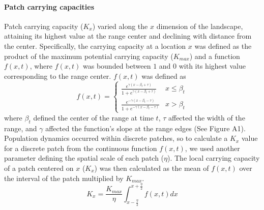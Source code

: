 \documentclass[11pt]{article}
\begin{document}
\paragraph{Patch carrying capacities}
Patch carrying capacity ($K_{x}$) varied along the $x$ dimension of the landscape, attaining its highest value at the range center and declining with distance from the center. Specifically, the carrying capacity at a location $x$ was defined as the product of the maximum potential carrying capacity ($K_{max}$) and a function $f(x,t)$, where $f(x,t)$ was bounded between $1$ and $0$ with its highest value corresponding to the range center. $f(x,t)$ was defined as
\begin{equation}
f(x,t)=
\begin{cases}
	\frac{e^{\gamma(x-\beta_{t}+\tau)}}{1+e^{\gamma(x-\beta_{t}+\tau)}} & x \leq \beta_{t} \\
	\frac{e^{-\gamma(x-\beta_{t}-\tau)}}{1+e^{-\gamma(x-\beta_{t}-\tau)}} & x > \beta_{t}
\end{cases}
\end{equation}
where $\beta_{t}$ defined the center of the range at time $t$, $\tau$ affected the width of the range, and $\gamma$ affected the function's slope at the range edges (See Figure A1). Population dynamics occurred within discrete patches, so to calculate a $K_{x}$ value for a discrete patch from the continuous function $f(x,t)$, we used another parameter defining the spatial scale of each patch ($\eta$). The local carrying capacity of a patch centered on $x$ ($K_{x}$) was then calculated as the mean of $f(x,t)$ over the interval of the patch multiplied by $K_{max}$.
\begin{equation}
K_{x} = \frac{K_{max}}{\eta}\int_{x-\frac{\eta}{2}}^{x+\frac{\eta}{2}}f(x,t)dx
\end{equation}
\end{document}
